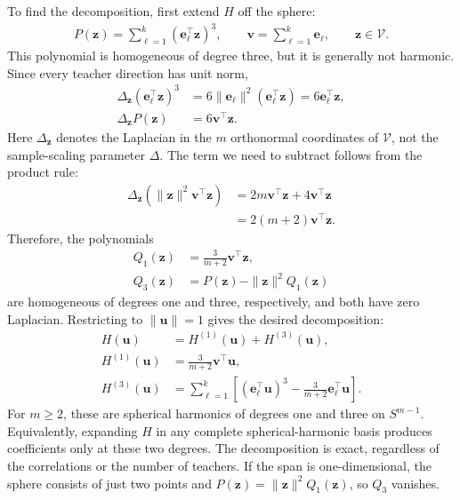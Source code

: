 \documentclass[11pt, reqno]{amsart}
\theoremstyle{notestyle}
\theoremstyle{defstyle}
\begin{document}
To find the decomposition, first extend $H$ off the sphere:
\begin{align*}
    P(\mathbf z) = \sum_{\ell=1}^k (\mathbf e_\ell^\top\mathbf z)^3,
    \qquad \mathbf v = \sum_{\ell=1}^k \mathbf e_\ell,
    \qquad \mathbf z\in\mathcal V.
\end{align*}
This polynomial is homogeneous of degree three, but it is generally not harmonic.
Since every teacher direction has unit norm,
\begin{align*}
    \Delta_{\mathbf z}(\mathbf e_\ell^\top\mathbf z)^3
    &= 6\|\mathbf e_\ell\|^2(\mathbf e_\ell^\top\mathbf z)
    = 6\mathbf e_\ell^\top\mathbf z, \\
    \Delta_{\mathbf z}P(\mathbf z) &= 6\mathbf v^\top\mathbf z.
\end{align*}
Here $\Delta_{\mathbf z}$ denotes the Laplacian in the $m$ orthonormal coordinates of $\mathcal V$, not the sample-scaling parameter $\Delta$.
The term we need to subtract follows from the product rule:
\begin{align*}
    \Delta_{\mathbf z}\left(\|\mathbf z\|^2\mathbf v^\top\mathbf z\right)
    &= 2m\mathbf v^\top\mathbf z+4\mathbf v^\top\mathbf z \\
    &= 2(m+2)\mathbf v^\top\mathbf z.
\end{align*}
Therefore, the polynomials
\begin{align*}
    Q_1(\mathbf z) &= \frac{3}{m+2}\mathbf v^\top\mathbf z, \\
    Q_3(\mathbf z) &= P(\mathbf z)-\|\mathbf z\|^2Q_1(\mathbf z)
\end{align*}
are homogeneous of degrees one and three, respectively, and both have zero Laplacian.
Restricting to $\|\mathbf u\|=1$ gives the desired decomposition:
\begin{align}
    H(\mathbf u) &= H^{(1)}(\mathbf u)+H^{(3)}(\mathbf u),
    \label{eq:H-harmonic-decomposition} \\
    H^{(1)}(\mathbf u) &= \frac{3}{m+2}\mathbf v^\top\mathbf u,
    \label{eq:H-degree-one} \\
    H^{(3)}(\mathbf u)
    &= \sum_{\ell=1}^k\left[(\mathbf e_\ell^\top\mathbf u)^3
    -\frac{3}{m+2}\mathbf e_\ell^\top\mathbf u\right].
    \label{eq:H-degree-three}
\end{align}
For $m\geq2$, these are spherical harmonics of degrees one and three on $S^{m-1}$.
Equivalently, expanding $H$ in any complete spherical-harmonic basis produces coefficients only at these two degrees.
The decomposition is exact, regardless of the correlations or the number of teachers.
If the span is one-dimensional, the sphere consists of just two points and $P(\mathbf z)=\|\mathbf z\|^2Q_1(\mathbf z)$, so $Q_3$ vanishes.
\end{document}
